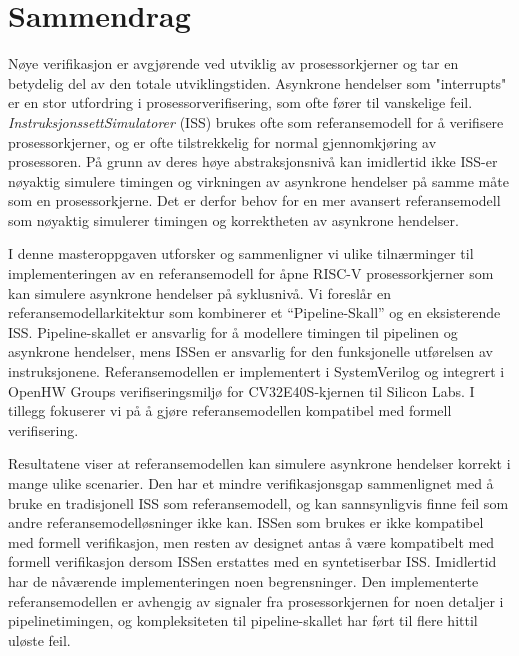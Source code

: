 \chapter*{Sammendrag}

Nøye verifikasjon er avgjørende ved utviklig av prosessorkjerner og tar en betydelig del av den totale utviklingstiden.
Asynkrone hendelser som "interrupts" er en stor utfordring i prosessorverifisering, som ofte fører til vanskelige feil. \textit{InstruksjonssettSimulatorer} (ISS) brukes ofte som referansemodell for å verifisere prosessorkjerner, og er ofte tilstrekkelig for normal gjennomkjøring av prosessoren. På grunn av deres høye abstraksjonsnivå kan imidlertid ikke ISS-er nøyaktig simulere timingen og virkningen av asynkrone hendelser på samme måte som en prosessor\-kjerne. Det er derfor behov for en mer avansert referansemodell som nøyaktig simulerer timingen og korrekt\-heten av asynkrone hendelser. 

I denne masteroppgaven utforsker og sammenligner vi ulike tilnærminger til implementeringen av en referansemodell for åpne RISC-V prosessorkjerner som kan simulere asynkrone hendelser på syklusnivå.  Vi foreslår en referansemodellarkitektur som kombinerer et “Pipeline-Skall” og en eksisterende ISS. Pipeline-skallet er ansvarlig for å modellere timingen til pipelinen og asynkrone hendelser, mens ISSen er ansvarlig for den funksjonelle utførelsen av instruksjonene. Referansemodellen er implementert i SystemVerilog og integrert i OpenHW Groups verifiseringsmiljø for CV32E40S-kjernen til Silicon Labs. I tillegg fokuserer vi på å gjøre referansemodellen kompatibel med formell verifisering.

Resultatene viser at referansemodellen kan simulere asynkrone hendelser korrekt i mange ulike scenarier. Den har et mindre verifikasjonsgap sammenlignet med å bruke en tradisjonell ISS som referansemodell, og kan sannsynligvis finne feil som andre referansemodelløsninger ikke kan. ISSen som brukes er ikke kompatibel med formell verifikasjon, men resten av designet antas å være kompatibelt med formell verifikasjon dersom ISSen erstattes med en syntetiserbar ISS. Imidlertid har de nåværende implementeringen noen begrensninger. Den implementerte referansemodellen er avhengig av signaler fra prosessorkjernen for noen detaljer i pipelinetimingen, og kompleksiteten til pipeline-skallet har ført til flere hittil uløste feil.


